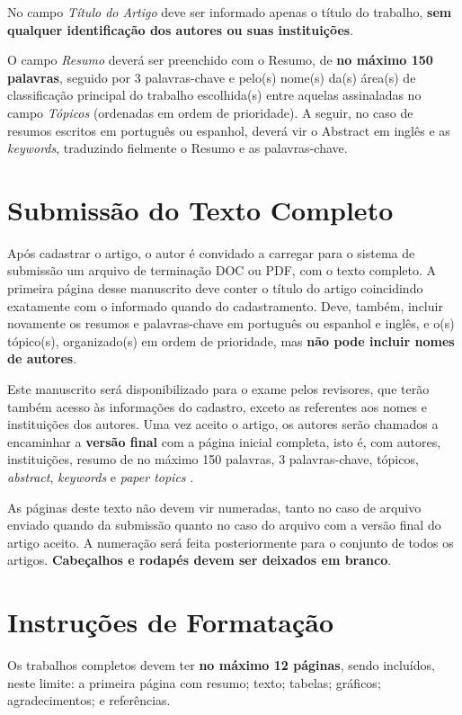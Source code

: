 \documentclass[a4paper,11pt]{article}
\begin{document}
No campo \textit{Título do Artigo} deve ser informado apenas o título do trabalho,
\textbf{sem qualquer identificação dos autores ou suas instituições}.

O campo \textit{Resumo} deverá ser preenchido com o Resumo, de \textbf{no máximo 150 palavras}, seguido por 3 palavras-chave e pelo(s) nome(s) da(s) área(s) de classificação principal do trabalho escolhida(s) entre aquelas assinaladas no campo \textit{Tópicos} (ordenadas em ordem de prioridade). A seguir, no caso de resumos escritos em português ou espanhol, deverá vir o Abstract em inglês e as \textit{keywords}, traduzindo fielmente o Resumo e as palavras-chave. 


\section{Submissão do Texto Completo}

Após cadastrar o artigo, o autor é convidado a carregar para o sistema de submissão um arquivo de terminação DOC ou PDF, com o texto completo. A primeira página desse manuscrito deve conter o título do artigo coincidindo exatamente com o informado quando do cadastramento. Deve, também, incluir novamente os resumos e palavras-chave em português ou espanhol e inglês, e o(s) tópico(s), organizado(s) em ordem de prioridade, mas \textbf{não pode incluir nomes de autores}.

Este manuscrito será disponibilizado para o exame pelos revisores, que terão também acesso às informações do cadastro, exceto as referentes aos nomes e instituições dos autores. Uma vez aceito o artigo, os autores serão chamados a encaminhar a \textbf{versão final} com a página inicial completa, isto é, com autores, instituições, resumo de no máximo 150 palavras, 3 palavras-chave, tópicos, \textit{abstract}, \textit{keywords} e \textit{paper topics} .

As páginas deste texto não devem vir numeradas, tanto no caso de arquivo enviado quando da submissão quanto no caso do arquivo com a versão final do artigo aceito. A numeração será feita posteriormente para o conjunto de todos os artigos. \textbf{Cabeçalhos e rodapés devem ser deixados em branco}.


\section{Instruções de Formatação}

Os trabalhos completos devem ter \textbf{no máximo 12 páginas}, sendo incluídos, neste limite: a primeira página com resumo; texto; tabelas; gráficos; agradecimentos; e referências.
\end{document}
